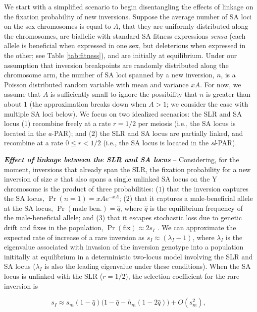 \documentclass{article}[12pt]
\begin{document}
We start with a simplified scenario to begin disentangling the effects of linkage on the fixation probability of new inversions. Suppose the average number of SA loci on the sex chromosomes is equal to $A$, that they are uniformly distributed along the chromosomes, are biallelic with standard SA fitness expressions {\itshape sensu} \citet{Kidwell1977} (each allele is beneficial when expressed in one sex, but deleterious when expressed in the other; see Table \ref{tab:fitness}), and are initially at equilibrium. Under our assumption that inversion breakpoints are randomly distributed along the chromosome arm, the number of SA loci spanned by a new inversion, $n$, is a Poisson distributed random variable with mean and variance $xA$. For now, we assume that $A$ is sufficiently small to ignore the possibility that $n$ is greater than about $1$ (the approximation breaks down when $A > 1$; we consider the case with multiple SA loci below). We focus on two idealized scenarios: the SLR and SA locus ($1$) recombine freely at a rate $r = 1/2$ per meiosis (i.e., the SA locus is located in the {\itshape a}-PAR); and ($2$) the SLR and SA locus are partially linked, and recombine at a rate $0 \leq r < 1/2$ (i.e., the SA locus is located in the {\itshape sl}-PAR). 

{\bf \itshape Effect of linkage between the SLR and SA locus} -- Considering, for the moment, inversions that already span the SLR, the fixation probability for a new inversion of size $x$ that also spans a single unlinked SA locus on the Y chromosome is the product of three probabilities: ($1$) that the inversion captures the SA locus, $\Pr(n = 1) = xA e^{-xA}$; ($2$) that it captures a male-beneficial allele at the SA locus, $\Pr(\text{male~ben.}) = \hat{q}$, where $\hat{q}$ is the equilibrium frequency of the male-beneficial allele; and ($3$) that it escapes stochastic loss due to genetic drift and fixes in the population, $\Pr(\text{fix}) \approx 2 s_I$ \cite{Haldane1927}. We can approximate the expected rate of increase of a rare inversion as $s_I \approx (\lambda_I - 1)$, where $\lambda_I$ is the eigenvalue associated with invasion of the inversion genotype into a population inititally at equilibrium in a deterministic two-locus model involving the SLR and SA locus ($\lambda_I$ is also the leading eigenvalue under these conditions). When the SA locus is unlinked with the SLR ($r = 1/2$), the selection coefficient for the rare inversion is

\begin{equation}\label{eq:SApFix2LocUnlinked}
	s_I \approx s_m (1 - \hat{q}) \big( 1 - \hat{q} - h_m(1 - 2\hat{q}) \big) + O(s_{m}^{2}),
\end{equation}
\end{document}
